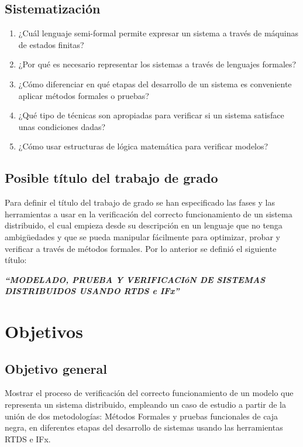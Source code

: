 \subsection{Sistematizaci\'on}

\begin{enumerate}

\item ¿Cu\'al lenguaje semi-formal permite expresar un sistema a trav\'es de 
m\'aquinas de estados finitas?
 \item ¿Por qu\'e es necesario representar los sistemas a trav\'es de lenguajes 
formales?
\item ¿C\'omo diferenciar en qu\'e etapas del desarrollo de un sistema es 
conveniente aplicar m\'etodos formales o pruebas?
\item ¿Qu\'e tipo de t\'ecnicas son apropiadas para verificar si un sistema 
satisface unas condiciones dadas?
\item ¿C\'omo usar estructuras de l\'ogica matem\'atica para verificar 
modelos?
\end{enumerate}

\subsection{Posible t\'itulo del trabajo de grado}
Para definir el t\'itulo del trabajo de grado se han especificado las fases y 
las herramientas a usar en la verificaci\'on del correcto funcionamiento de un 
sistema distribuido, el cual empieza desde su descripci\'on en un lenguaje que 
no tenga ambig\"uedades y que se pueda manipular f\'acilmente para optimizar, 
probar y verificar a trav\'es de m\'etodos formales. Por lo anterior se 
defini\'o el siguiente t\'itulo:


\textbf{\textit{``MODELADO, PRUEBA Y VERIFICACI\'oN DE SISTEMAS DISTRIBUIDOS 
USANDO RTDS e IFx''}}


\section{Objetivos}

\subsection{Objetivo general}

Mostrar el proceso de verificaci\'on del correcto funcionamiento de un modelo 
que representa un sistema distribuido, empleando un caso de estudio a partir de 
la uni\'on de dos metodolog\'ias: M\'etodos Formales y pruebas funcionales de 
caja negra, en diferentes etapas del desarrollo de sistemas usando las 
herramientas RTDS e IFx.

